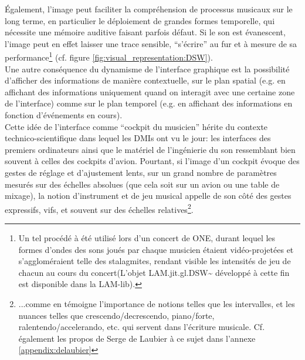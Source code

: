 \indent Également, l'image peut faciliter la compréhension de processus musicaux sur le long terme, en particulier le déploiement de grandes formes temporelle, qui nécessite une mémoire auditive faisant parfois défaut. Si le son est évanescent, l'image peut en effet laisser une trace sensible, ``s'écrire'' au fur et à mesure de sa performance\footnote{Un tel procédé à été utilisé lors d'un concert de ONE, durant lequel les formes d'ondes des sons joués par chaque musicien étaient vidéo-projetées et s'aggloméraient telle des stalagmites, rendant visible les intensités de jeu de chacun au cours du concert(L'objet LAM.jit.gl.DSW\textasciitilde{} développé à cette fin est disponible dans la LAM-lib).} (cf. figure \ref{fig:visual_representation:DSW}).\\
\indent Une autre conséquence du dynamisme de l'interface graphique est la possibilité d'afficher des informations de manière contextuelle, sur le plan spatial (e.g. en affichant des informations uniquement quand on interagit avec une certaine zone de l'interface) comme sur le plan temporel (e.g. en affichant des informations en fonction d'événements en cours).\\
\indent Cette idée de l'interface comme ``cockpit du musicien'' \cite{vertegaal_towards_1996} hérite du contexte technico-scientifique dans lequel les \glspl{DMI} ont vu le jour: les interfaces des premiers ordinateurs ainsi que le matériel de l'ingénierie du son ressemblant bien souvent à celles des cockpits d'avion. Pourtant, si l'image d'un cockpit évoque des gestes de réglage et d'ajustement lents, sur un grand nombre de paramètres mesurés sur des échelles absolues (que cela soit sur un avion ou une table de mixage), la notion d'instrument et de jeu musical appelle de son côté des gestes expressifs, vifs, et souvent sur des échelles relatives\footnote{...comme en témoigne l'importance de notions telles que les intervalles, et les nuances telles que crescendo/decrescendo, piano/forte, ralentendo/accelerando, etc. qui servent dans l'écriture musicale. Cf. également les propos de Serge de Laubier à ce sujet dans l'annexe \ref{appendix:delaubier}}.

